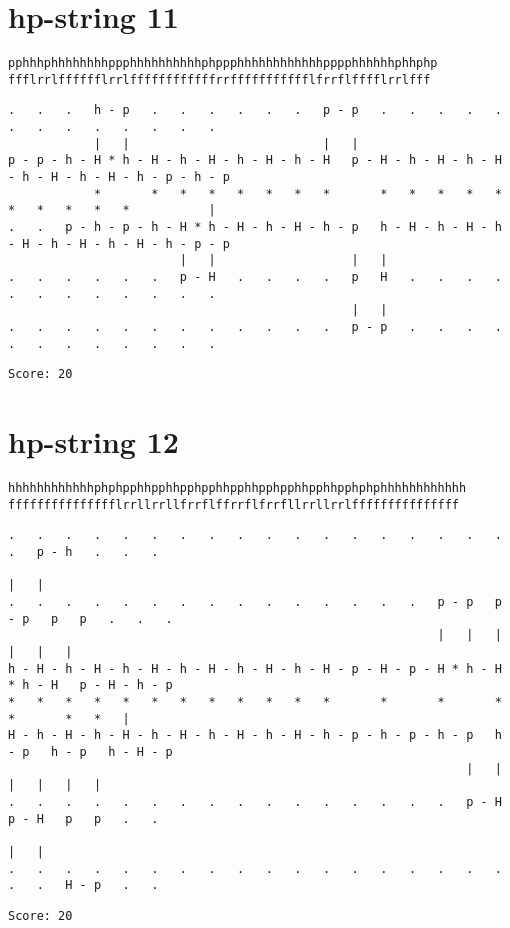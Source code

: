 \documentclass[a4paper,oneside,article,11pt]{memoir}
\begin{document}
\section*{hp-string 11}
\begin{lstlisting}
pphhhphhhhhhhhppphhhhhhhhhhphppphhhhhhhhhhhhpppphhhhhhphhphp
ffflrrlfffffflrrlffffffffffffrrffffffffffflfrrflfffflrrlfff
\end{lstlisting}
\begin{lstlisting}[basicstyle=\fontsize{6}{11}\ttfamily]
.   .   .   h - p   .   .   .   .   .   .   p - p   .   .   .   .   .   .   .   .   .   .   .   .   .
            |   |                           |   |
p - p - h - H * h - H - h - H - h - H - h - H   p - H - h - H - h - H - h - H - h - H - h - p - h - p
            *       *   *   *   *   *   *   *       *   *   *   *   *   *   *   *   *   *           |
.   .   p - h - p - h - H * h - H - h - H - h - p   h - H - h - H - h - H - h - H - h - H - h - p - p
                        |   |                   |   |
.   .   .   .   .   .   p - H   .   .   .   .   p   H   .   .   .   .   .   .   .   .   .   .   .   .
                                                |   |
.   .   .   .   .   .   .   .   .   .   .   .   p - p   .   .   .   .   .   .   .   .   .   .   .   .
\end{lstlisting}

\begin{lstlisting}
Score: 20
\end{lstlisting}

\section*{hp-string 12}
\begin{lstlisting}
hhhhhhhhhhhhphphpphhpphhpphpphhpphhpphpphhpphhpphphphhhhhhhhhhhh
ffffffffffffffflrrllrrllfrrflffrrflfrrfllrrllrrlfffffffffffffff
\end{lstlisting}
\begin{lstlisting}[basicstyle=\fontsize{6}{11}\ttfamily]
.   .   .   .   .   .   .   .   .   .   .   .   .   .   .   .   .   .   .   p - h   .   .   .
                                                                            |   |
.   .   .   .   .   .   .   .   .   .   .   .   .   .   .   p - p   p - p   p   p   .   .   .
                                                            |   |   |   |   |   |
h - H - h - H - h - H - h - H - h - H - h - H - p - H - p - H * h - H * h - H   p - H - h - p
*   *   *   *   *   *   *   *   *   *   *   *       *       *       *       *       *   *   |
H - h - H - h - H - h - H - h - H - h - H - h - p - h - p - h - p   h - p   h - p   h - H - p
                                                                |   |   |   |   |   |
.   .   .   .   .   .   .   .   .   .   .   .   .   .   .   .   p - H   p - H   p   p   .   .
                                                                                |   |
.   .   .   .   .   .   .   .   .   .   .   .   .   .   .   .   .   .   .   .   H - p   .   .
\end{lstlisting}
\begin{lstlisting}
Score: 20
\end{lstlisting}
\end{document}
